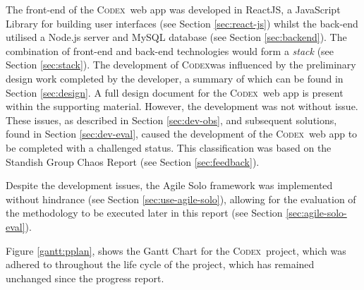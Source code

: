 \documentclass[final]{cmpreport}
\newcommand{\Codex}{\textsc{Codex}}
\begin{document}
	The front-end of the \Codex \ web app was developed in ReactJS, a JavaScript Library for building user interfaces (see Section \ref{sec:react-js}) whilst the back-end utilised a Node.js server and MySQL database (see Section \ref{sec:backend}). The combination of front-end and back-end technologies would form a \emph{stack} (see Section \ref{sec:stack}). The development of \Codex was influenced by the preliminary design work completed by the developer, a summary of which can be found in Section \ref{sec:design}. A full design document for the \Codex \ web app is present within the supporting material. However, the development was not without issue. These issues, as described in Section \ref{sec:dev-obs}, and subsequent solutions, found in Section \ref{sec:dev-eval}, caused the development of the \Codex \ web app to be completed with a challenged status. This classification was based on the Standish Group Chaos Report (see Section \ref{sec:feedback}).
	
	Despite the development issues, the Agile Solo framework was implemented without hindrance (see Section \ref{sec:use-agile-solo}), allowing for the evaluation of the methodology to be executed later in this report (see Section \ref{sec:agile-solo-eval}). 
	
	Figure \ref{gantt:pplan}, shows the Gantt Chart for the \Codex \ project, which was adhered to throughout the life cycle of the project, which has remained unchanged since the progress report. 
	
\end{document}
